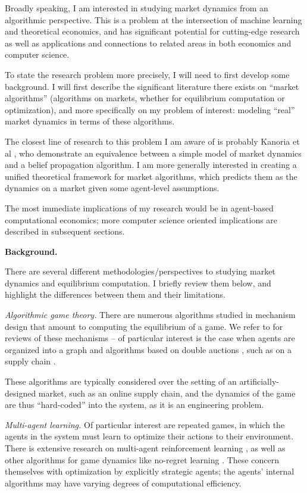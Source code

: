 \documentclass{article}
\newcommand{\statement}[1]{\par\medskip
  {\textbf{#1.}}\space
}
\newcommand{\substatement}[1]{\par\medskip
  {\emph{#1.}}\space
}
\begin{document}
Broadly speaking, I am interested in studying market dynamics from an algorithmic perspective. This is a problem at the intersection of machine learning and theoretical economics, and has significant potential for cutting-edge research as well as applications and connections to related areas in both economics and computer science.

To state the research problem more precisely, I will need to first develop some background. I will first describe the significant literature there exists on ``market algorithms'' (algorithms on markets, whether for equilibrium computation or optimization), and more specifically on my problem of interest: modeling ``real'' market dynamics in terms of these algorithms. 

The closest line of research to this problem I am aware of is probably Kanoria et al \cite{bayati1, bayati2, bayati3}, who demonstrate an equivalence between a simple model of market dynamics and a belief propagation algorithm. I am more generally interested in creating a unified theoretical framework for market algorithms, which predicts them as the dynamics on a market given some agent-level assumptions.

The most immediate implications of my research would be in agent-based computational economics; more computer science oriented implications are described in subsequent sections.

\statement{Background} 

There are several different methodologies/perspectives to studying market dynamics and equilibrium computation. I briefly review them below, and highlight the differences between them and their limitations. 

\substatement{Algorithmic game theory} There are numerous algorithms studied in mechanism design that amount to computing the equilibrium of a game. We refer to \cite{agt:5, tesfatsion, gode} for reviews of these mechanisms -- of particular interest is the case when agents are organized into a graph \cite{kakade} and algorithms based on double auctions \cite{tagiew, mcafee}, such as on a supply chain \cite{babaioff-nisan, babaioff-walsh}.

These algorithms are typically considered over the setting of an artificially-designed market, such as an online supply chain, and the dynamics of the game are thus ``hard-coded'' into the system, as it is an engineering problem. 

\substatement{Multi-agent learning} Of particular interest are repeated games, in which the agents in the system must learn to optimize their actions to their environment. There is extensive research on multi-agent reinforcement learning \cite{zhang, canese}, as well as other algorithms for game dynamics like no-regret learning \cite{calliess}. These concern themselves with optimization by explicitly strategic agents; the agents' internal algorithms may have varying degrees of computational efficiency.
\end{document}
